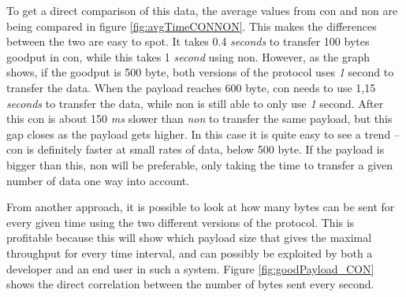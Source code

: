 
\noindent To get a direct comparison of this data, the average values from \gls{con} and \gls{non} are being compared in figure \ref{fig:avgTimeCONNON}. This makes the differences between the two are easy to spot. It takes 0.4 \textit{seconds} to transfer 100 bytes \gls{goodput} in \gls{con}, while this takes 1 \textit{second} using \gls{non}. However, as the graph shows, if the goodput is 500 byte, both versions of the protocol uses \textit{1} second to transfer the data. When the \gls{payload} reaches 600 byte, \gls{con} needs to use 1,15 \textit{seconds} to transfer the data, while \gls{non} is still able to only use \textit{1} second. After this \gls{con} is about 150 \textit{ms} slower than \textit{non} to transfer the same payload, but this gap closes as the payload gets higher. In this case it is quite easy to see a trend -- \gls{con} is definitely faster at small rates of data, below 500 byte. If the payload is bigger than this, \gls{non} will be preferable, only taking the time to transfer a given number of data one way into account.





\noindent From another approach, it is possible to look at how many bytes can be sent for every given time using the two different versions of the protocol. This is profitable because this will show which payload size that gives the maximal \gls{throughput} for every time interval, and can possibly be exploited by both a developer and an end user in such a system. Figure \ref{fig:goodPayload_CON} shows the direct correlation between the number of bytes sent every second. 

